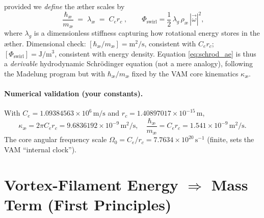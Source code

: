 \documentclass[a4paper,12pt]{article}
\begin{document}
    provided we \emph{define} the æther scales by
    \begin{equation}
        \boxed{\;\frac{\hbar_\text{\ae}}{m_\text{\ae}} \;=\; \lambda_\text{\ae} \;=\; C_e r_c\;}\!,
        \qquad
        \Phi_\text{swirl}=\frac{1}{2}\,\lambda_g\,\rho_\text{\ae}\,|\vec\omega|^2,
    \end{equation}
    where $\lambda_g$ is a dimensionless stiffness capturing how rotational energy stores in the æther. Dimensional check: $[\hbar_\text{\ae}/m_\text{\ae}]=\text{m}^2/\text{s}$, consistent with $C_e r_c$; $[\Phi_\text{swirl}]=\text{J}/\text{m}^3$, consistent with energy density. Equation \eqref{eq:schrod_ae} is thus a \emph{derivable} hydrodynamic Schrödinger equation (not a mere analogy), following the Madelung program but with $\hbar_\text{\ae}/m_\text{\ae}$ fixed by the VAM core kinematics $\kappa_\text{\ae}$.

    \paragraph{Numerical validation (your constants).}
    With $C_e=1.09384563\times10^6\,\text{m/s}$ and $r_c=1.40897017\times10^{-15}\,\text{m}$,
    \[
        \kappa_\text{\ae}=2\pi C_e r_c=9.6836192\times 10^{-9}\,\text{m}^2/\text{s},\quad
        \frac{\hbar_\text{\ae}}{m_\text{\ae}}=C_e r_c=1.541\times 10^{-9}\,\text{m}^2/\text{s}.
    \]
    The core angular frequency scale $\Omega_0=C_e/r_c=7.7634\times 10^{20}\,\text{s}^{-1}$ (finite, sets the VAM ``internal clock'').

    \medskip

    \section{Vortex-Filament Energy $\Rightarrow$ Mass Term (First Principles)}
    \label{sec:mass_from_energy}
\end{document}
